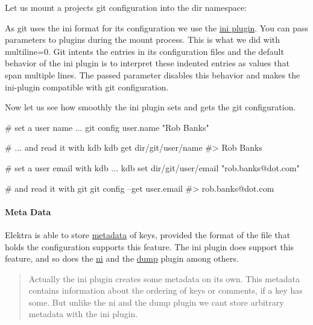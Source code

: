 Let us mount a projects git configuration into the dir namespace\+:




As git uses the {\ttfamily ini} format for its configuration we use the \hyperlink{md_src_plugins_ini_README_src_plugins_ini_README_md}{ini plugin}. You can pass parameters to plugins during the mount process. This is what we did with {\ttfamily multiline=0}. Git intents the entries in its configuration files and the default behavior of the {\ttfamily ini} plugin is to interpret these indented entries as values that span multiple lines. The passed parameter disables this behavior and makes the ini-\/plugin compatible with git configuration.

Now let us see how smoothly the ini plugin sets and gets the git configuration.


\begin{DoxyCode}
# set a user name ...
git config user.name "Rob Banks"

# ... and read it with kdb
kdb get dir/git/user/name
#> Rob Banks

# set a user email with kdb ...
kdb set dir/git/user/email "rob.banks@dot.com"

# and read it with git
git config --get user.email
#> rob.banks@dot.com
\end{DoxyCode}


\paragraph*{Meta Data}

Elektra is able to store \hyperlink{md_doc_help_elektra-metadata_doc_help_elektra-metadata_md}{metadata} of keys, provided the format of the file that holds the configuration supports this feature. The ini plugin does support this feature, and so does the \hyperlink{md_src_plugins_ni_README_src_plugins_ni_README_md}{ni} and the \hyperlink{md_src_plugins_dump_README_src_plugins_dump_README_md}{dump} plugin among others.

\begin{quote}
Actually the ini plugin creates some metadata on its own. This metadata contains information about the ordering of keys or comments, if a key has some. But unlike the ni and the dump plugin we can\textquotesingle{}t store arbitrary metadata with the ini plugin. \end{quote}


